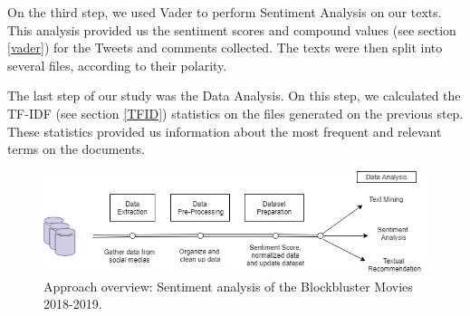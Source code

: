 
On the third step, we used Vader to perform Sentiment Analysis on our texts. This analysis provided us the sentiment scores and compound values (see section \ref{vader}) for the Tweets and comments collected. The texts were then split into several files, according to their polarity. 

The last step of our study was the Data Analysis. On this step, we calculated the TF-IDF (see section \ref{TFID}) statistics on the files generated on the previous step. These statistics provided us information about the most frequent and relevant terms on the documents. 


\begin{figure}[h]
\begin{center}
\includegraphics[width=0.6\linewidth]{img/model.png}
\end{center}
   \caption{Approach overview: Sentiment analysis of the Blockbluster Movies 2018-2019.}
\label{fig:approach}
\end{figure}

